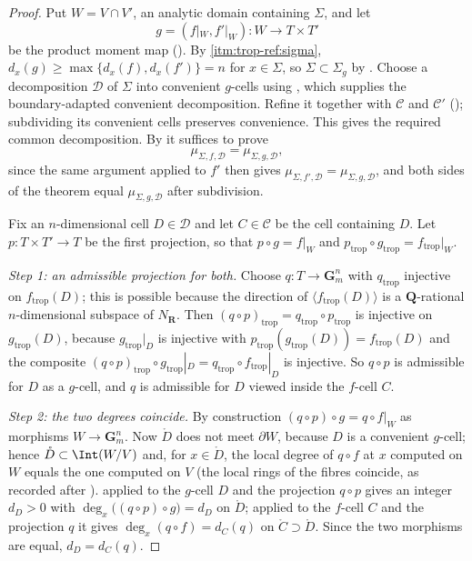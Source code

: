 \begin{proof}
Put $W=V\cap V'$, an analytic domain containing $\Sigma$, and let
\[
 g=(f|_W,f'|_W):W\longrightarrow T\times T'
\]
be the product moment map (). By
 \cref{itm:trop-ref:sigma},
$d_x(g)\ge\max\{d_x(f),d_x(f')\}=n$ for $x\in\Sigma$, so
$\Sigma\subset\Sigma_g$ by . Choose a
decomposition $\mathscr D$ of $\Sigma$ into convenient $g$-cells using
\cite[Lemma~14.1.5]{CLD25}, which supplies the boundary-adapted convenient
decomposition. Refine it together with $\mathscr C$ and $\mathscr C'$
(); subdividing its convenient
cells preserves convenience. This gives the required common decomposition.
By  it suffices to prove
\begin{equation}
\label{eq:trop-chart-indep-goal}
 \mu_{\Sigma,f,\mathscr D}=\mu_{\Sigma,g,\mathscr D},
\end{equation}
since the same argument applied to $f'$ then gives
$\mu_{\Sigma,f',\mathscr D}=\mu_{\Sigma,g,\mathscr D}$, and both sides of
the theorem equal $\mu_{\Sigma,g,\mathscr D}$ after subdivision.

Fix an $n$-dimensional cell $D\in\mathscr D$ and let $C\in\mathscr C$ be the
cell containing $D$. Let $p:T\times T'\to T$ be the first projection, so
that $p\circ g=f|_W$ and $p_{\mathrm{trop}}\circ g_{\mathrm{trop}}
=f_{\mathrm{trop}}|_W$.

\emph{Step 1: an admissible projection for both.} Choose
$q:T\to\mathbf G_m^n$ with $q_{\mathrm{trop}}$ injective on
$f_{\mathrm{trop}}(D)$; this is possible because
the direction of $\langle f_{\mathrm{trop}}(D)\rangle$ is a
$\mathbf Q$-rational $n$-dimensional subspace of $N_{\mathbf R}$. Then
$(q\circ p)_{\mathrm{trop}}=q_{\mathrm{trop}}\circ p_{\mathrm{trop}}$ is
injective on $g_{\mathrm{trop}}(D)$, because
$g_{\mathrm{trop}}|_D$ is injective with
$p_{\mathrm{trop}}(g_{\mathrm{trop}}(D))=f_{\mathrm{trop}}(D)$ and the
composite $(q\circ p)_{\mathrm{trop}}\circ g_{\mathrm{trop}}|_D
=q_{\mathrm{trop}}\circ f_{\mathrm{trop}}|_D$ is injective. So $q\circ p$ is
admissible for $D$ as a $g$-cell, and $q$ is admissible for $D$ viewed
inside the $f$-cell $C$.

\emph{Step 2: the two degrees coincide.} By construction
$(q\circ p)\circ g=q\circ f|_W$ as morphisms $W\to\mathbf G_m^n$. Now
$\mathring D$ does not meet $\partial W$, because $D$ is a convenient
$g$-cell; hence $\mathring D\subset\Int(W/V)$ and, for $x\in\mathring D$,
the local degree of $q\circ f$ at $x$ computed on $W$ equals the one
computed on $V$ (the local rings of the fibres coincide, as recorded after
).  applied to
the $g$-cell $D$ and the projection $q\circ p$ gives an integer $d_D>0$ with
$\deg_x\bigl((q\circ p)\circ g\bigr)=d_D$ on $\mathring D$; applied to the
$f$-cell $C$ and the projection $q$ it gives
$\deg_x(q\circ f)=d_C(q)$ on $\mathring C\supset\mathring D$. Since the two
morphisms are equal, $d_D=d_C(q)$.


\end{proof}
